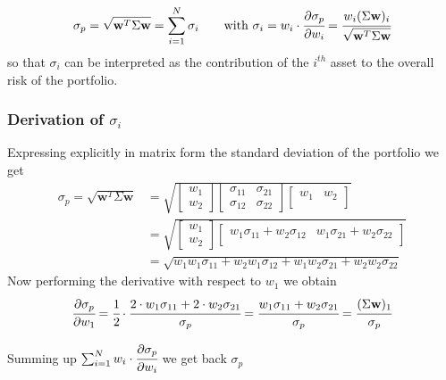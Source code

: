 \begin{equation} 
\sigma_p={\sqrt {\mathbf{w}^T\Sigma \mathbf{w}}} = \sum_{i=1}^{N}\sigma _{i}\qquad\textrm{with}~\sigma _{i} = w_{i}\cdot \cfrac{\partial\sigma_p}{\partial w_{i}}={\cfrac {w_{i}(\Sigma \mathbf{w})_{i}}{\sqrt {\mathbf{w}^T\Sigma \mathbf{w}}}}
\end{equation}
so that \(\sigma _{i}\) can be interpreted as the contribution of the $i^{th}$ asset to the overall risk of the portfolio.

\begin{attention}
\subsubsection{Derivation of $\sigma_i$}
Expressing explicitly in matrix form the standard deviation of the portfolio we get
\[
\begin{split}
\sigma_p={\sqrt {\mathbf{w}^T\Sigma \mathbf{w}}} & =
\sqrt{
	\begin{bmatrix}
	w_{1} \\
	w_{2}
	\end{bmatrix}
	\begin{bmatrix}
	\sigma_{11} & \sigma_{21} \\
	\sigma_{12} & \sigma_{22} 
	\end{bmatrix}
	\begin{bmatrix}
	w_{1} & w_{2} \\
	\end{bmatrix}
}\\
&=
\sqrt{
	\begin{bmatrix}
	w_{1} \\
	w_{2}
	\end{bmatrix}
	\begin{bmatrix}
w_{1}\sigma_{11} + w_{2}\sigma_{12} & w_{1}\sigma_{21} + w_{2}\sigma_{22} \\
	\end{bmatrix}
} \\
&= \sqrt{
w_{1}w_{1}\sigma_{11} + w_{2}w_{1}\sigma_{12} + w_{1}w_{2}\sigma_{21} + w_{2}w_{2}\sigma_{22} }
\end{split}
\]
Now performing the derivative with respect to $w_1$ we obtain
\[\cfrac{\partial\sigma_p}{\partial w_1} = \cfrac{1}{2}\cdot\cfrac{2\cdot w_1\sigma_{11} + 2\cdot w_{2}\sigma_{21}}{\sigma_p} = \cfrac{w_1\sigma_{11} + w_{2}\sigma_{21}}{\sigma_p} = \cfrac{(\Sigma \mathbf{w})_{1}}{\sigma_p}\]
	
Summing up $\sum_{i=1}^{N} w_i\cdot\cfrac{\partial\sigma_p}{\partial w_i}$ we get back $\sigma_p$
\end{attention}

